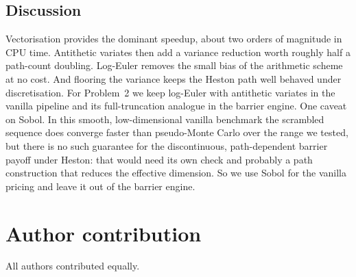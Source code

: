 \documentclass[12pt,a4paper]{article}
\begin{document}
\subsection{Discussion}
Vectorisation provides the dominant speedup, about two orders of magnitude in
CPU time. Antithetic variates then add a variance reduction worth roughly half a
path-count doubling. Log-Euler removes the small bias of the arithmetic scheme
at no cost. And flooring the variance keeps the Heston path well behaved under
discretisation. For Problem~2 we keep log-Euler with antithetic variates in the
vanilla pipeline and its full-truncation analogue in the barrier engine. One
caveat on Sobol. In this smooth, low-dimensional vanilla benchmark the scrambled
sequence does converge faster than pseudo-Monte Carlo over the range we tested,
but there is no such guarantee for the discontinuous, path-dependent barrier
payoff under Heston: that would need its own check and probably a path
construction that reduces the effective dimension. So we use Sobol for the
vanilla pricing and leave it out of the barrier engine.

\section{Author contribution}

All authors contributed equally.
\end{document}
